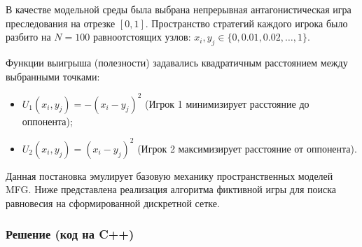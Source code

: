 В качестве модельной среды была выбрана непрерывная антагонистическая игра преследования на отрезке $[0, 1]$. Пространство стратегий каждого игрока было разбито на $N = 100$ равноотстоящих узлов: $x_i, y_j \in \{0, 0.01, 0.02, \dots, 1\}$. 

Функции выигрыша (полезности) задавались квадратичным расстоянием между выбранными точками:
\begin{itemize}
    \item $U_1(x_i, y_j) = -(x_i - y_j)^2$ (Игрок 1 минимизирует расстояние до оппонента);
    \item $U_2(x_i, y_j) = (x_i - y_j)^2$ (Игрок 2 максимизирует расстояние от оппонента).
\end{itemize}

Данная постановка эмулирует базовую механику пространственных моделей MFG. Ниже представлена реализация алгоритма фиктивной игры для поиска равновесия на сформированной дискретной сетке.

\subsubsection{Решение (код на C++)}

